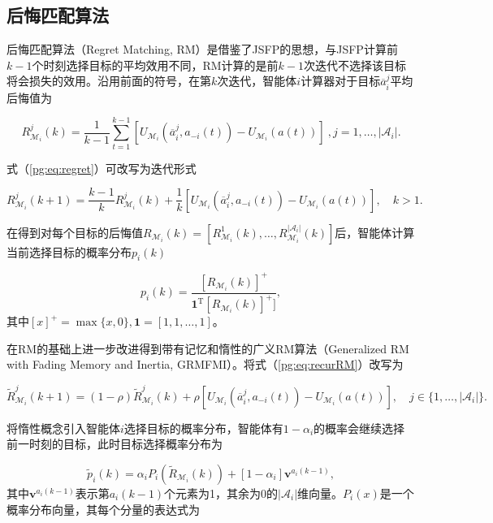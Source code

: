 \subsection{后悔匹配算法}
\label{pgta:protocal:RM}

后悔匹配算法（Regret Matching, RM）是借鉴了JSFP的思想，与JSFP计算前$k-1$个时刻选择目标的平均效用不同，RM计算的是前$k-1$次迭代不选择该目标将会损失的效用。沿用前面的符号，在第$k$次迭代，智能体$i$计算器对于目标$\overline a_i^j$平均后悔值为

\begin{equation}
\label{pg:eq:regret}
	R_{\mathcal{M}_i}^j(k) = \frac{1}{k-1}\sum_{t=1}^{k-1} [U_{\mathcal{M}_i}(\overline a_i^j, a_{-i}(t)) - U_{\mathcal{M}_i}(a(t))]\ ,j=1,\dots,|\mathcal{A}_i|.
\end{equation}

式（\ref{pg:eq:regret}）可改写为迭代形式

\begin{equation}
\label{pg:eq:recurRM}
	R_{\mathcal{M}_i}^j(k+1) = \frac{k-1}{k}R_{\mathcal{M}_i}^j(k) + \frac{1}{k} [U_{\mathcal{M}_i}(\overline a_i^j, a_{-i}(t)) - U_{\mathcal{M}_i}(a(t))],\quad k>1.
\end{equation}

在得到对每个目标的后悔值$R_{\mathcal{M}_i}(k)=[R_{\mathcal{M}_i}^1(k),\dots,R_{\mathcal{M}_i}^{|\mathcal{A}_i|}(k)]$后，智能体计算当前选择目标的概率分布$p_i(k)$

\begin{equation}
\label{pg:eq:rmpdf}
	p_i(k) = \frac{[R_{\mathcal{M}_i}(k)]^+}{{\bm 1}^{\mathrm T}[R_{\mathcal{M}_i}(k)]^+]},
\end{equation}
其中$[x]^+=\max\{x,0\},{\bm 1}=[1,1,\dots,1]$。

在RM的基础上进一步改进得到带有记忆和惰性的广义RM算法（Generalized RM with Fading Memory and Inertia, GRMFMI）。将式（\ref{pg:eq:recurRM}）改写为

\begin{equation}
	\widetilde R_{\mathcal{M}_i}^j(k+1) = (1-\rho)\widetilde R_{\mathcal{M}_i}^j(k) + \rho [U_{\mathcal{M}_i}(\overline a_i^j, a_{-i}(t)) - U_{\mathcal{M}_i}(a(t))],\quad j \in \{1,\dots,|\mathcal{A}_i|\}.
\end{equation}

将惰性概念引入智能体$i$选择目标的概率分布，智能体有$1-\alpha_i$的概率会继续选择前一时刻的目标，此时目标选择概率分布为

\begin{equation}
\label{pg:eq:interiapdf}
	\widetilde p_i(k) = \alpha_i P_i(\widetilde R_{\mathcal{M}_i}(k)) + [1-\alpha _i]{\bm v}^{a_i(k-1)},
\end{equation}
其中${\bm v}^{a_i(k-1)}$表示第$a_i(k-1)$个元素为1，其余为0的$|\mathcal{A}_i|$维向量。$P_i(x)$是一个概率分布向量，其每个分量的表达式为

